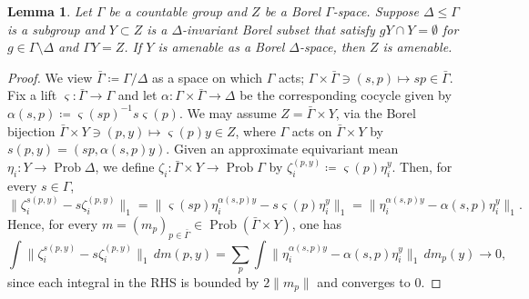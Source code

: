 \documentclass[12pt,nosumlimits,nonamelimits]{amsart}
\newtheorem{lem}[thm]{Lemma}
\theoremstyle{remark}
\theoremstyle{definition}
\newcommand{\Ga}{\Gamma}
\DeclareMathOperator{\Prob}{Prob}
\begin{document}
\begin{lem}\label{lem:fd} 
Let $\Ga$ be a countable group and 
$Z$ be a Borel $\Ga$-space. 
Suppose $\Delta\le\Ga$ is a subgroup and $Y\subset Z$ is 
a $\Delta$-invariant Borel subset that satisfy 
$gY\cap Y=\emptyset$ for $g\in\Ga\setminus\Delta$ and  
$\Ga Y=Z$.  
If $Y$ is amenable as a Borel $\Delta$-space, then $Z$ is amenable. 
\end{lem}
\begin{proof}
We view $\bar{\Ga} \coloneq \Ga/\Delta$ 
as a space on which $\Ga$ acts; 
$\Ga\times\bar{\Ga}\ni(s,p)\mapsto sp\in\bar{\Ga}$.
Fix a lift $\varsigma\colon \bar{\Ga}\to\Ga$ and let 
$\alpha\colon \Ga \times \bar{\Ga} \to \Delta$ be 
the corresponding cocycle given by 
$\alpha(s,p) \coloneq \varsigma(sp)^{-1}s\varsigma(p)$. 
We may assume $Z=\bar{\Ga}\times Y$, via 
the Borel bijection 
$\bar{\Ga}\times Y\ni (p,y) \mapsto \varsigma(p)y\in Z$, 
where 
$\Ga$ acts on $\bar{\Ga}\times Y$ by $s(p,y) = (sp,\alpha(s,p)y)$.
Given an approximate equivariant mean $\eta_i\colon Y\to \Prob \Delta$, 
we define $\zeta_i\colon \bar{\Ga}\times Y\to \Prob \Ga$ 
by $\zeta_i^{(p,y)} \coloneq \varsigma(p)\eta_i^y$. 
Then, for every $s\in\Ga$, 
\[
\| \zeta_i^{s(p,y)} - s\zeta_i^{(p,y)} \|_1
 = \| \varsigma(sp)\eta_i^{\alpha(s,p)y} - s\varsigma(p)\eta_i^y \|_1
 = \| \eta_i^{\alpha(s,p)y} -  \alpha(s,p)\eta_i^y \|_1.
\]
Hence, for every $m =(m_p)_{p\in\bar{\Ga}}\in \Prob(\bar{\Ga}\times Y)$, one has 
\[
\int \| \zeta_i^{s(p,y)} - s\zeta_i^{(p,y)} \|_1\,dm(p,y)
 = \sum_p \int \| \eta_i^{\alpha(s,p)y} -  \alpha(s,p)\eta_i^y \|_1\,dm_p(y)
 \to0,
\]
since each integral in the RHS is bounded by $2\|m_p\|$ and 
converges to $0$. 
\end{proof}
\end{document}

